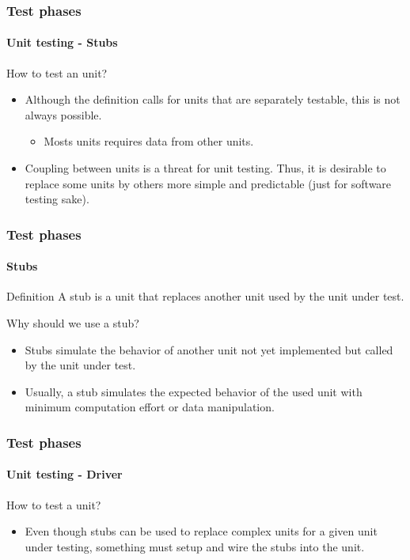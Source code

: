 \begin{frame}
\frametitle{Test phases}
\framesubtitle{Unit testing - Stubs}

\begin{block:fact}{How to test an unit?}
\begin{itemize}
	\item Although the definition calls for units that are separately testable,
	this is not always possible.
	\begin{itemize}
		\item Mosts units requires data from other units.
	\end{itemize}

	\item Coupling between units is a threat for unit testing. Thus, it is
	desirable to replace some units by others more simple and predictable
	(just for software testing sake).
\end{itemize}
\end{block:fact}
\end{frame}



\begin{frame}
\frametitle{Test phases}
\framesubtitle{Stubs}
\label{concept:stub}

\begin{block:concept}{Definition}
A stub is a unit that replaces another unit used by the unit under test.
\end{block:concept}

\begin{block:fact}{Why should we use a stub?}
\begin{itemize}
	\item Stubs simulate the behavior of another unit not yet implemented but
	called by the unit under test.

	\item Usually, a stub simulates the expected behavior of the used unit with
	minimum computation effort or data manipulation.
\end{itemize}
\end{block:fact}

\hfill
{}
\end{frame}


\begin{frame}
\frametitle{Test phases}
\framesubtitle{Unit testing - Driver}

\begin{block:fact}{How to test a unit?}
\begin{itemize}
	\item Even though stubs can be used to replace complex units for a given
	unit under testing, something must setup and wire the stubs into the
	unit.
\end{itemize}
\end{block:fact}
\end{frame}



